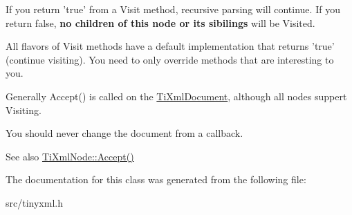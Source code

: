 \-If you return 'true' from a \-Visit method, recursive parsing will continue. \-If you return false, {\bfseries no children of this node or its sibilings} will be \-Visited.

\-All flavors of \-Visit methods have a default implementation that returns 'true' (continue visiting). \-You need to only override methods that are interesting to you.

\-Generally \-Accept() is called on the \hyperlink{classTiXmlDocument}{\-Ti\-Xml\-Document}, although all nodes suppert \-Visiting.

\-You should never change the document from a callback.

\begin{DoxySeeAlso}{\-See also}
\hyperlink{classTiXmlNode_acc0f88b7462c6cb73809d410a4f5bb86}{\-Ti\-Xml\-Node\-::\-Accept()} 
\end{DoxySeeAlso}


\-The documentation for this class was generated from the following file\-:\begin{DoxyCompactItemize}
\item 
src/tinyxml.\-h\end{DoxyCompactItemize}
